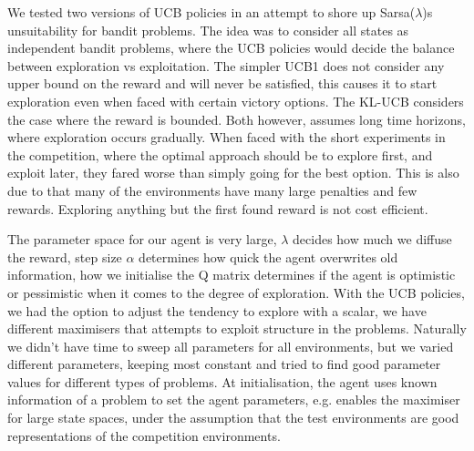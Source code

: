 
We tested two versions of UCB policies in an attempt to shore up Sarsa($\lambda$)s unsuitability for bandit problems. The idea was to consider all states as independent bandit problems, where the UCB policies would decide the balance between exploration vs exploitation. The simpler UCB1 does not consider any upper bound on the reward and will never be satisfied, this causes it to start exploration even when faced with certain victory options. The KL-UCB considers the case where the reward is bounded. Both however, assumes long time horizons, where exploration occurs gradually. When faced with the short experiments in the competition, where the optimal approach should be to explore first, and exploit later, they fared worse than simply going for the best option. This is also due to that many of the environments have many large penalties and few rewards. Exploring anything but the first found reward is not cost efficient. 

The parameter space for our agent is very large, $\lambda$ decides how much we diffuse the reward, step size $\alpha$ determines how quick the agent overwrites old information, how we initialise the Q matrix determines if the agent is optimistic or pessimistic when it comes to the degree of exploration. With the UCB policies, we had the option to adjust the tendency to explore with a scalar, we have different maximisers that attempts to exploit structure in the problems. Naturally we didn't have time to sweep all parameters for all environments, but we varied different parameters, keeping most constant and tried to find good parameter values for different types of problems. At initialisation, the agent uses known information of a problem to set the agent parameters, e.g. enables the maximiser for large state spaces, under the assumption that the test environments are good representations of the competition environments.

